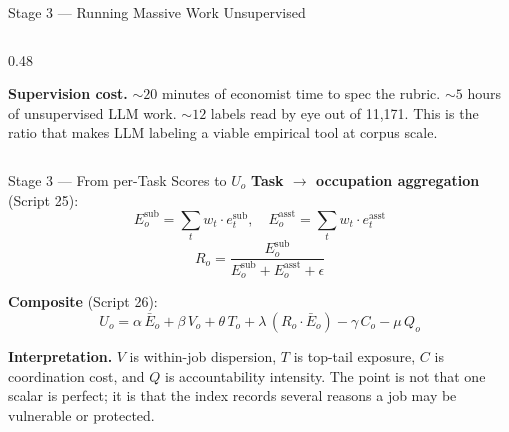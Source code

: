 \documentclass[10pt,english,aspectratio=169]{beamer}
\begin{document}
\begin{frame}[fragile]{Stage 3 --- Running Massive Work Unsupervised}
\begin{columns}[T]
\begin{column}{0.48\textwidth}
\vspace{0.1cm}
\begin{tcolorbox}[colback=blue!3,colframe=RedTitle!60]\scriptsize
\textbf{Supervision cost.} $\sim 20$ minutes of economist time to spec the rubric. $\sim 5$ hours of unsupervised LLM work. $\sim 12$ labels read by eye out of 11{,}171. This is the ratio that makes LLM labeling a viable empirical tool at corpus scale.
\end{tcolorbox}
\end{column}
\end{columns}
\end{frame}

\begin{frame}{Stage 3 --- From per-Task Scores to $U_o$}
\textbf{Task $\to$ occupation aggregation} (Script 25):
\[
E^{\text{sub}}_o = \sum_t w_t \cdot e^{\text{sub}}_t, \quad
E^{\text{asst}}_o = \sum_t w_t \cdot e^{\text{asst}}_t
\]
\[
R_o = \frac{E^{\text{sub}}_o}{E^{\text{sub}}_o + E^{\text{asst}}_o + \epsilon}
\]

\vspace{0.12cm}
\textbf{Composite} (Script 26):
\[
U_o = \alpha\,\bar E_o + \beta\,V_o + \theta\,T_o + \lambda\,(R_o \cdot \bar E_o) - \gamma\,C_o - \mu\,Q_o
\]

\vspace{0.08cm}
\begin{tcolorbox}[colback=gray!5,colframe=gray!40]\scriptsize
\textbf{Interpretation.} $V$ is within-job dispersion, $T$ is top-tail exposure, $C$ is coordination cost, and $Q$ is accountability intensity. The point is not that one scalar is perfect; it is that the index records several reasons a job may be vulnerable or protected.
\end{tcolorbox}
\end{frame}
\end{document}
